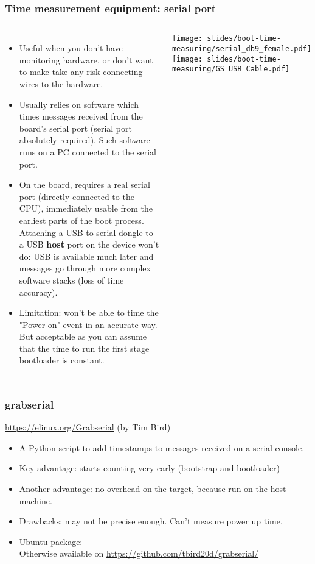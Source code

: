 \begin{frame}
\frametitle{Time measurement equipment: serial port}
\begin{columns}
\small
\begin{itemize}
\item Useful when you don't have monitoring hardware, or don't want to make
      take any risk connecting wires to the hardware.
\item Usually relies on software which times messages received from the board's
      serial port (serial port absolutely required). Such software
      runs on a PC connected to the serial port.
\item On the board, requires a real serial port (directly connected to the CPU),
      immediately usable from the earliest parts of the boot process.
      Attaching a USB-to-serial dongle to a USB {\bf host} port on
      the device won't do: USB is available much later and messages
      go through more complex software stacks (loss of time accuracy).
\item Limitation: won't be able to time the "Power on" event in
      an accurate way. But acceptable as you can assume that
      the time to run the first stage bootloader is constant.
\end{itemize}
\texttt{[image: slides/boot-time-measuring/serial\_db9\_female.pdf]}\\
\vspace{1cm}
\texttt{[image: slides/boot-time-measuring/GS\_USB\_Cable.pdf]}
\end{columns}
\end{frame}

\begin{frame}
\frametitle{grabserial}
\url{https://elinux.org/Grabserial} (by Tim Bird)
\begin{itemize}
\item A Python script to add timestamps to messages received on a
      serial console.
\item Key advantage: starts counting very early (bootstrap and bootloader)
\item Another advantage: no overhead on the target, because run on the host machine.
\item Drawbacks: may not be precise enough. Can't measure power up time.
\item Ubuntu package: \\
      Otherwise available on \url{https://github.com/tbird20d/grabserial/}
\end{itemize}
\end{frame}

